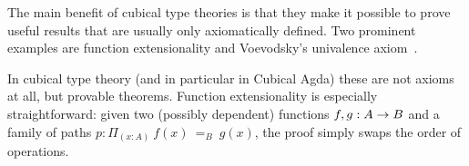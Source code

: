 The main benefit of cubical type theories is that they make it possible to prove
useful results that are usually only axiomatically defined. Two
prominent examples are function extensionality and Voevodsky's univalence
axiom~\cite{voevodsky2014}.

In cubical type theory (and in particular in Cubical Agda) these are not axioms
at all, but provable theorems. Function extensionality is especially
straightforward: given two (possibly dependent) functions $f,g : A \rightarrow B$ and a
family of paths $p : \Pi_{(x:A)}~f(x)~=_B~g(x)$, the proof simply swaps the
order of operations.
\begin{code}%
\>[0]\AgdaSpace{}%
\AgdaSymbol{:}\AgdaSpace{}%
\AgdaSymbol{\{}\AgdaSpace{}%
\AgdaSpace{}%
\AgdaSymbol{:}\AgdaSpace{}%
\AgdaSymbol{\}}\AgdaSpace{}%
\AgdaSymbol{\{}\AgdaSpace{}%
\AgdaSpace{}%
\AgdaSymbol{:}\AgdaSpace{}%
\AgdaSpace{}%
\AgdaSpace{}%
\AgdaSymbol{\}}\AgdaSpace{}%
\AgdaSymbol{(}\AgdaSpace{}%
\AgdaSymbol{:}\AgdaSpace{}%
\AgdaSymbol{(}\AgdaSpace{}%
\AgdaSymbol{:}\AgdaSpace{}%
\AgdaSymbol{)}\AgdaSpace{}%
\AgdaSpace{}%
\AgdaSpace{}%
\AgdaSpace{}%
\AgdaSpace{}%
\AgdaSpace{}%
\AgdaSymbol{)}\AgdaSpace{}%
\AgdaSpace{}%
\AgdaSpace{}%
\AgdaSpace{}%
\<%
\\
\>[0]\AgdaSpace{}%
\AgdaSpace{}%
\AgdaSpace{}%
\AgdaSpace{}%
\AgdaSymbol{=}\AgdaSpace{}%
\AgdaSpace{}%
\AgdaSpace{}%
\<%
\end{code}

